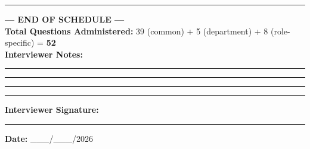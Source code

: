 \documentclass[10pt,a4paper]{article}
\begin{document}
\vspace{3pt}\noindent\rule{\textwidth}{1pt}
\begin{center}
{\large\bfseries --- END OF SCHEDULE ---}\\[3pt]
\textbf{Total Questions Administered:} 39 (common) + 5 (department) + 8 (role-specific) = \textbf{52}\\[8pt]
\textbf{Interviewer Notes:}\vspace{4pt}

\rule{\textwidth}{0.4pt}\vspace{4pt}
\rule{\textwidth}{0.4pt}\vspace{4pt}
\rule{\textwidth}{0.4pt}\vspace{4pt}
\rule{\textwidth}{0.4pt}\vspace{12pt}

\textbf{Interviewer Signature:} \rule{5cm}{0.4pt}\qquad\textbf{Date:} \_\_\_/\_\_\_/2026
\end{center}
\end{document}
